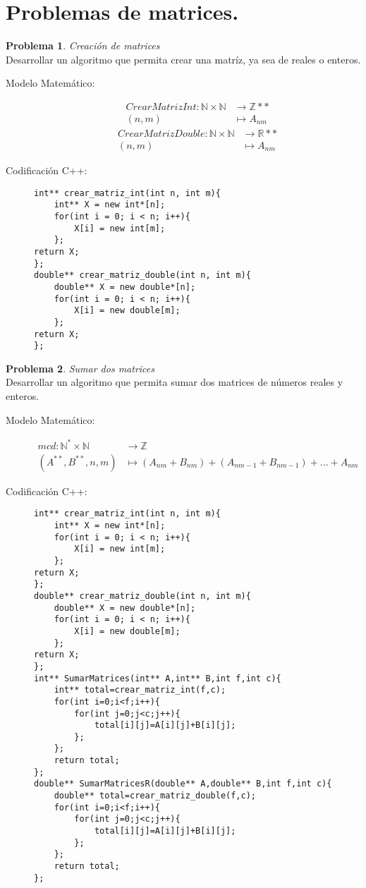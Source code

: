 \documentclass{article}
\theoremstyle{plain}
\theoremstyle{definition}
\newtheorem{problem}{Problema}
\begin{document}
\section{Problemas de matrices.}

\begin{problem} \emph{Creación de matrices}\\
Desarrollar un algoritmo que permita crear una matríz, ya sea de reales o enteros.
\begin{description}
\item[Modelo Matemático:]
\begin{align*}
CrearMatrizInt: \mathbb{N}\times\mathbb{N} &\to \mathbb{Z**}\\
(n,m) &\mapsto
A_{nm}
\end{align*}
\begin{align*}
CrearMatrizDouble: \mathbb{N}\times\mathbb{N} &\to \mathbb{R**}\\
(n,m) &\mapsto
A_{nm}
\end{align*}
%
\item[Codificación \textsf{C++}:]\hfill
%
\begin{verbatim}
int** crear_matriz_int(int n, int m){
    int** X = new int*[n];
    for(int i = 0; i < n; i++){
        X[i] = new int[m];
    };
return X;
};
double** crear_matriz_double(int n, int m){
    double** X = new double*[n];
    for(int i = 0; i < n; i++){
        X[i] = new double[m];
    };
return X;
};
\end{verbatim}
\end{description}
\end{problem}
\begin{problem} \emph{Sumar dos matrices}\\
Desarrollar un algoritmo que permita sumar dos matrices de números reales y enteros.
\begin{description}
\item[Modelo Matemático:]
\begin{align*}
mcd: \mathbb{N}^{*}\times\mathbb{N} &\to \mathbb{Z}\\
(A^{**},B^{**},n,m) &\mapsto
(A_{nm}+B_{nm})+(A_{nm-1}+B_{nm-1})+...+A_{nm}
\end{align*}
%
\item[Codificación \textsf{C++}:]\hfill
%
\begin{verbatim}
int** crear_matriz_int(int n, int m){
    int** X = new int*[n];
    for(int i = 0; i < n; i++){
        X[i] = new int[m];
    };
return X;
};
double** crear_matriz_double(int n, int m){
    double** X = new double*[n];
    for(int i = 0; i < n; i++){
        X[i] = new double[m];
    };
return X;
};
int** SumarMatrices(int** A,int** B,int f,int c){
    int** total=crear_matriz_int(f,c);
    for(int i=0;i<f;i++){
        for(int j=0;j<c;j++){
            total[i][j]=A[i][j]+B[i][j];
        };
    };
    return total;
};
double** SumarMatricesR(double** A,double** B,int f,int c){
    double** total=crear_matriz_double(f,c);
    for(int i=0;i<f;i++){
        for(int j=0;j<c;j++){
            total[i][j]=A[i][j]+B[i][j];
        };
    };
    return total;
};

\end{verbatim}
\end{description}
\end{problem}
\end{document}
